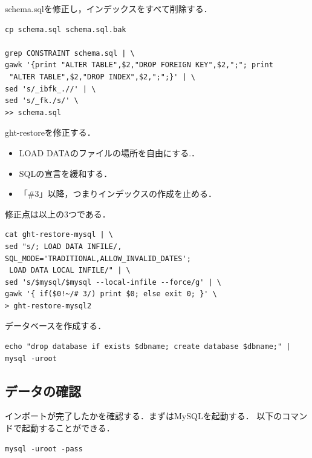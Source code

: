 \newpage
schema.sqlを修正し，インデックスをすべて削除する．

\begin{lstlisting}[basicstyle=\ttfamily\footnotesize, frame=single]
cp schema.sql schema.sql.bak

grep CONSTRAINT schema.sql | \
gawk '{print "ALTER TABLE",$2,"DROP FOREIGN KEY",$2,";"; print
 "ALTER TABLE",$2,"DROP INDEX",$2,";";}' | \
sed 's/_ibfk_.//' | \
sed 's/_fk./s/' \
>> schema.sql
\end{lstlisting}
ght-restoreを修正する．

\begin{itemize}
\item LOAD DATAのファイルの場所を自由にする.．
\item SQLの宣言を緩和する．
\item 「\#3」以降，つまりインデックスの作成を止める．
\end{itemize}
修正点は以上の3つである．

\begin{lstlisting}[basicstyle=\ttfamily\footnotesize, frame=single]
cat ght-restore-mysql | \
sed "s/; LOAD DATA INFILE/, SQL_MODE='TRADITIONAL,ALLOW_INVALID_DATES';
 LOAD DATA LOCAL INFILE/" | \
sed 's/$mysql/$mysql --local-infile --force/g' | \
gawk '{ if($0!~/# 3/) print $0; else exit 0; }' \
> ght-restore-mysql2
\end{lstlisting}
データベースを作成する．
\begin{lstlisting}[basicstyle=\ttfamily\footnotesize, frame=single]
echo "drop database if exists $dbname; create database $dbname;" | mysql -uroot
\end{lstlisting}

\newpage

\subsection{データの確認}
インポートが完了したかを確認する．まずはMySQLを起動する．
以下のコマンドで起動することができる．
\begin{lstlisting}[basicstyle=\ttfamily\footnotesize, frame=single]
mysql -uroot -pass
\end{lstlisting}
 
